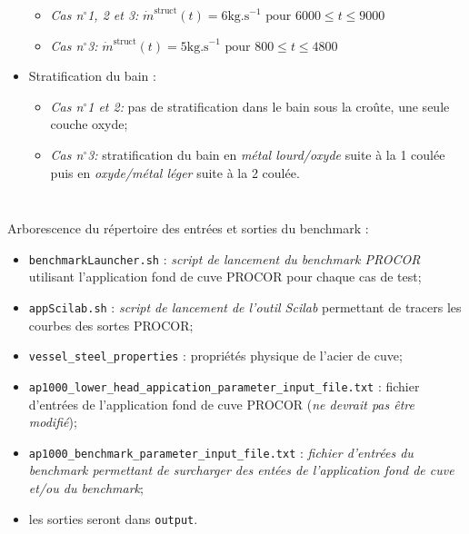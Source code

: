 \begin{frame}[fragile]
\begin{columns}
\begin{itemize}
\begin{itemize}
				\item \emph{Cas n$^{\circ}$1, 2 et 3:} {\tiny $\dot{m}^{\text{struct}}(t) = 6\text{kg.s}^{-1} \text{ pour } 6000\leq t\leq 9000$}
				\item \emph{Cas n$^{\circ}$3:} 
					{\tiny $\dot{m}^{\text{struct}}(t) = 5\text{kg.s}^{-1} \text{ pour } 800\leq t\leq 4800$}
			\end{itemize}
		\item Stratification du bain :
			\begin{itemize}
					\item \emph{Cas n$^{\circ}$1 et 2:} pas de stratification dans le bain sous la croûte, une seule couche oxyde;
					\item \emph{Cas n$^{\circ}$3:} stratification du bain en \emph{métal lourd/oxyde} suite à la 1\iere{} coulée puis en \emph{oxyde/métal léger} suite à la 2\ieme{} coulée.
			\end{itemize}
	\end{itemize}
	\end{columns}
\end{frame}
\begin{frame}[fragile]
Arborescence du répertoire des entrées et sorties du benchmark :
\begin{itemize}
	\item \texttt{benchmarkLauncher.sh} : \emph{script de lancement du benchmark PROCOR} utilisant l'application fond de cuve PROCOR pour chaque cas de test;
	\item \texttt{appScilab.sh} : \emph{script de lancement de l'outil Scilab} permettant de tracers les courbes des sortes PROCOR;
	\item \texttt{vessel\_steel\_properties} : propriétés physique de l'acier de cuve;
	\item \texttt{ap1000\_lower\_head\_appication\_parameter\_input\_file.txt} : fichier d'entrées de l'application fond de cuve PROCOR (\emph{ne devrait pas être modifié});
	\item \texttt{ap1000\_benchmark\_parameter\_input\_file.txt} : \emph{fichier d'entrées du benchmark permettant de surcharger des entées de l'application fond de cuve et/ou du benchmark};
	\item les sorties seront dans \texttt{output}.
\end{itemize}
\end{frame}
